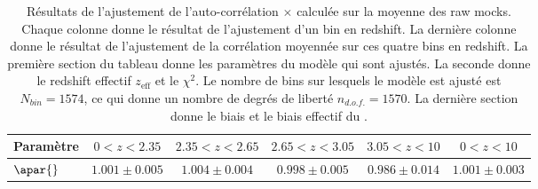\begin{table}[h]
  \centering
  \caption{Résultats de l'ajustement de l'auto-corrélation \lya{}$\times$\lya{} calculée sur la moyenne des \Nmocks{} raw mocks. Chaque colonne donne le résultat de l'ajustement d'un bin en redshift. La dernière colonne donne le résultat de l'ajustement de la corrélation moyennée sur ces quatre bins en redshift. La première section du tableau donne les paramètres du modèle qui sont ajustés. La seconde donne le redshift effectif $z_{\mathrm{eff}}$ et le $\chi^2$. Le nombre de bins sur lesquels le modèle est ajusté est $N_{bin} = \num{1574}$, ce qui donne un nombre de degrés de liberté $n_{d.o.f.} = \num{1570}$. La dernière section donne le biais et le biais effectif du \lya{}.}
  \label{tab:cf_ebossraw_4bins}
  \footnotesize
  \begin{tabular}{lccccc}
\toprule
Param\`etre  & $\num{0} < z < \num{2.35}$ & $\num{2.35} < z < \num{2.65}$ & $\num{2.65} < z < \num{3.05}$ & $\num{3.05} < z < \num{10}$  & $\num{0} < z < \num{10}$ \\
\midrule
$\apar{} $ & $ 1.001 \pm 0.005$ & $ 1.004 \pm 0.004$ & $ 0.998 \pm 0.005$ & $ 0.986 \pm 0.014$ & $ 1.001 \pm 0.003$ \\

\end{tabular}
\end{table}
